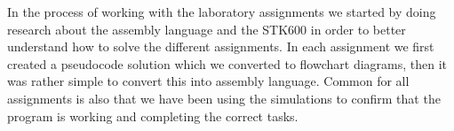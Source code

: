 In the process of working with the laboratory assignments we started by doing research about the assembly language and the STK600 in order to better understand how to solve the different assignments. 
In each assignment we first created a pseudocode solution which we converted to flowchart diagrams, then it was rather simple to convert this into assembly language. Common for all assignments is also that we have been using the simulations to confirm that the program is working and completing the correct tasks. 
